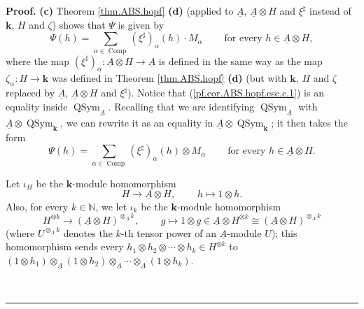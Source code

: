 \documentclass[numbers=enddot,12pt,final,onecolumn,notitlepage,abstracton]{scrartcl}%
\theoremstyle{definition}
\newenvironment{proof}[1][Proof]{\noindent\textbf{#1.} }{\ \rule{0.5em}{0.5em}}
\let\sumnonlimits\sum
\renewcommand{\sum}{\sumnonlimits\limits}
\begin{document}
\begin{proof}
\textbf{(c)} Theorem \ref{thm.ABS.hopf} \textbf{(d)} (applied to
$\underline{A}$, $\underline{A}\otimes H$ and $\xi^{\sharp}$ instead of
$\mathbf{k}$, $H$ and $\zeta$) shows that $\Psi$ is given by%
\begin{equation}
\Psi\left(  h\right)  =\sum_{\alpha\in\operatorname*{Comp}}\left(  \xi
^{\sharp}\right)  _{\alpha}\left(  h\right)  \cdot M_{\alpha}%
\ \ \ \ \ \ \ \ \ \ \text{for every }h\in\underline{A}\otimes H,
\label{pf.cor.ABS.hopf.esc.c.1}%
\end{equation}
where the map $\left(  \xi^{\sharp}\right)  _{\alpha}:\underline{A}\otimes
H\rightarrow\underline{A}$ is defined in the same way as the map
$\zeta_{\alpha}:H\rightarrow\mathbf{k}$ was defined in Theorem
\ref{thm.ABS.hopf} \textbf{(d)} (but with $\mathbf{k}$, $H$ and $\zeta$
replaced by $\underline{A}$, $\underline{A}\otimes H$ and $\xi^{\sharp}$).
Notice that (\ref{pf.cor.ABS.hopf.esc.c.1}) is an equality inside
$\operatorname*{QSym}\nolimits_{\underline{A}}$. Recalling that we are
identifying $\operatorname*{QSym}\nolimits_{\underline{A}}$ with
$\underline{A}\otimes\operatorname*{QSym}\nolimits_{\mathbf{k}}$, we can
rewrite it as an equality in $\underline{A}\otimes\operatorname*{QSym}%
\nolimits_{\mathbf{k}}$; it then takes the form%
\begin{equation}
\Psi\left(  h\right)  =\sum_{\alpha\in\operatorname*{Comp}}\left(  \xi
^{\sharp}\right)  _{\alpha}\left(  h\right)  \otimes M_{\alpha}%
\ \ \ \ \ \ \ \ \ \ \text{for every }h\in\underline{A}\otimes H.
\label{pf.cor.ABS.hopf.esc.c.2}%
\end{equation}


Let $\iota_{H}$ be the $\mathbf{k}$-module homomorphism%
\[
H\rightarrow\underline{A}\otimes H,\ \ \ \ \ \ \ \ \ \ h\mapsto1\otimes h.
\]
Also, for every $k\in\mathbb{N}$, we let $\iota_{k}$ be the $\mathbf{k}%
$-module homomorphism%
\[
H^{\otimes k}\rightarrow\left(  \underline{A}\otimes H\right)  ^{\otimes
_{\underline{A}}k},\ \ \ \ \ \ \ \ \ \ g\mapsto1\otimes g\in\underline{A}%
\otimes H^{\otimes k}\cong\left(  \underline{A}\otimes H\right)
^{\otimes_{\underline{A}}k}%
\]
(where $U^{\otimes_{\underline{A}}k}$ denotes the $k$-th tensor power of an
$\underline{A}$-module $U$); this homomorphism sends every $h_{1}\otimes
h_{2}\otimes\cdots\otimes h_{k}\in H^{\otimes k}$ to $\left(  1\otimes
h_{1}\right)  \otimes_{\underline{A}}\left(  1\otimes h_{2}\right)
\otimes_{\underline{A}}\cdots\otimes_{\underline{A}}\left(  1\otimes
h_{k}\right)  $.


\end{proof}
\end{document}
